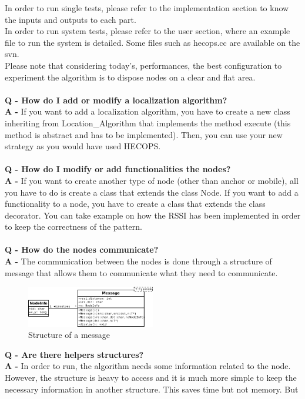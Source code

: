 \documentclass[a4paper,10pt]{article}
\begin{document}
In order to run single tests, please refer to the implementation section to know the inputs and outputs to each part.\\
In order to run system tests, please refer to the user section, where an example file to run the system is detailed. Some files such as hecops.cc
are available on the svn.\\
Please note that considering today's, performances, the best configuration to experiment the algorithm is to dispose nodes on a clear and flat
area.
\\ \\
\textbf{Q - How do I add or modify a localization algorithm?} \\
\textbf{A - }If you want to add a localization algorithm, you have to create a new class inheriting from Location\_Algorithm that implements the 
method execute (this method is abstract and has to be implemented). Then, you can use your new strategy as you would have used HECOPS.
\\ \\
\textbf{Q - How do I modify or add functionalities the nodes?} \\
\textbf{A - }If you want to create another type of node (other than anchor or mobile), all you have to do is create a class that extends the class
Node. If you want to add a functionality to a node, you have to create a class that extends the class decorator. You can take example on how the
RSSI has been implemented in order to keep the correctness of the pattern.
\\ \\
\textbf{Q - How do the nodes communicate?} \\
\textbf{A - }The communication between the nodes is done through a structure of message that allows them to communicate what they need to communicate.
\begin{figure}[H]
\centering
 \includegraphics[width=0.5\textwidth]{msg.png}
\caption{Structure of a message}
\end{figure}
\noindent
\textbf{Q - Are there helpers structures?} \\
\textbf{A - }In order to run, the algorithm needs some information related to the node. However, the
structure is heavy to access and it is much more simple to keep the necessary information in another structure. This saves time but not memory. But
\end{document}
